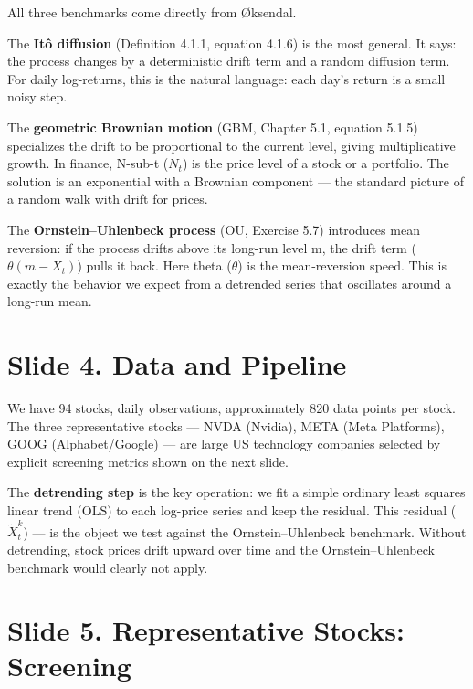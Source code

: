 \documentclass[12pt,a4paper]{article}
\begin{document}
All three benchmarks come directly from Øksendal.

The \textbf{Itô diffusion} (Definition 4.1.1, equation 4.1.6) is the most general.
It says: the process changes by a deterministic drift term and a random diffusion term.
For daily log-returns, this is the natural language:
each day's return is a small noisy step.

The \textbf{geometric Brownian motion}
($\text{GBM}$, Chapter 5.1, equation 5.1.5)
specializes the drift to be proportional to the current level,
giving multiplicative growth.
In finance, N-sub-t ($N_t$) is the price level of a stock or a portfolio.
The solution is an exponential with a Brownian component ---
the standard picture of a random walk with drift for prices.

The \textbf{Ornstein--Uhlenbeck process}
($\text{OU}$, Exercise 5.7)
introduces mean reversion:
if the process drifts above its long-run level m,
the drift term ($\theta(m - X_t)$) pulls it back.
Here theta ($\theta$) is the mean-reversion speed.
This is exactly the behavior we expect from a detrended series
that oscillates around a long-run mean.

\section{Slide 4. Data and Pipeline}

We have 94 stocks, daily observations,
approximately 820 data points per stock.
The three representative stocks ---
NVDA (Nvidia), META (Meta Platforms), GOOG (Alphabet/Google) ---
are large US technology companies selected by explicit screening metrics
shown on the next slide.

The \textbf{detrending step} is the key operation:
we fit a simple ordinary least squares linear trend ($\text{OLS}$)
to each log-price series and keep the residual.
This residual ($\widetilde{X}_t^k$) ---
is the object we test against the Ornstein--Uhlenbeck benchmark.
Without detrending, stock prices drift upward over time
and the Ornstein--Uhlenbeck benchmark would clearly not apply.

\section{Slide 5. Representative Stocks: Screening}
\end{document}
